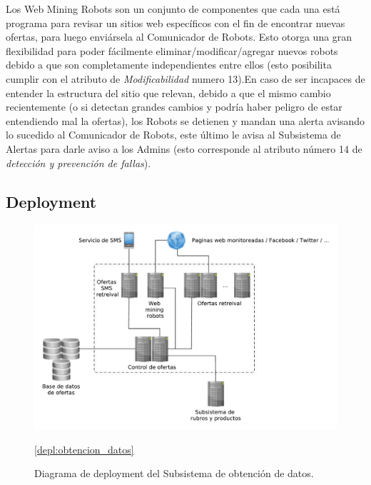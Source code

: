 Los \textsf{Web Mining Robots} son un conjunto de componentes que cada una está programa para revisar un sitios web específicos con el fin de encontrar nuevas ofertas, para luego enviársela al \textsf{Comunicador de Robots}. Esto otorga una gran flexibilidad para poder fácilmente eliminar/modificar/agregar nuevos robots debido a que son completamente independientes entre ellos (esto posibilita cumplir con el atributo de \emph{Modificabilidad} numero 13).En caso de ser incapaces de entender la estructura del sitio que relevan, debido a que el mismo cambio recientemente (o si detectan grandes cambios y podría haber peligro de estar entendiendo mal la ofertas), los Robots se detienen y mandan una alerta avisando lo sucedido al \textsf{Comunicador de Robots}, este último le avisa al \textsf{Subsistema de Alertas} para darle aviso a los Admins (esto corresponde al atributo número 14 de \emph{detección y prevención de fallas}).
\vspace{9pt}





\subsection{Deployment}

\begin{figure}[H]
	\centering
	\includegraphics[width=\textwidth]{graficos/deploy/deploy_obtencion_datos.pdf}
	\caption{Diagrama de deployment del \textsf{Subsistema de obtención de datos}.}
	\ref{depl:obtencion_datos}
\end{figure}

